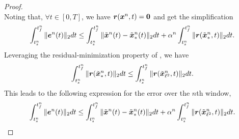 \begin{proof}
\begin{equation*}
\end{equation*}
Noting that, $\forall t \in [0,T]$, we have $\boldsymbol r({\boldsymbol x}^{n},t) = \boldsymbol 0$ and get the simplification 
\begin{equation*}
\int_{t_s^{n}}^{t_f^{n}} \| \boldsymbol e^{n}(t) \|_2 dt \le \int_{t_s^{n}}^{t_f^{n}} \| \tilde{\boldsymbol x}^{n}(t) - \tilde{\boldsymbol x}_{*}^{n}(t) \|_2 dt + \alpha^{n} \int_{t_s^{n}}^{t_f^{n}} \|  \boldsymbol r(\tilde{\boldsymbol x}_{*}^{n},t)  \|_2 dt.
\end{equation*}
Leveraging the residual-minimization property of \methodAcronym, we have 
$$ \int_{t_s^{n}}^{t_f^{n}} \| \boldsymbol r(\tilde{\boldsymbol x}_{*}^{n},t) \|_2dt \le \int_{t_s^{n}}^{t_f^{n}} \| \boldsymbol r(\tilde{\boldsymbol x}_{\ell^2}^{n},t) \|_2dt.$$
This leads to the following expression for the error over the $n$th window,
\begin{equation}\label{eq:boundtmp}
\int_{t_s^{n}}^{t_f^{n}} \| \boldsymbol e^{n}(t) \|_2 dt \le \int_{t_s^{n}}^{t_f^{n}} \| \tilde{\boldsymbol x}^{n}(t) - \tilde{\boldsymbol x}_{*}^{n}(t) \|_2 dt + \alpha^{n} \int_{t_s^{n}}^{t_f^{n}} \|  \boldsymbol r(\tilde{\boldsymbol x}_{\ell^2}^{n},t)  \|_2 dt.
\end{equation}
\begin{comment}
To obtain an expression for $\norm{\stateROMSolArg{n}{t} - \stateROMStarSolArgt{n}{t}}$ start by noting that
$\stateROMStarSolArg{n}$ and $\stateROMSolArg{n}$ are defined by the systems,
\begin{align*} 
&\frac{d}{dt} \genstateROMSolArg{n}   -
\basisspace^T  \velocity(\basisspace \genstateROMSolArg{n} + \stateIntercept,t) =  \adjointROMSolArg{n} , \\
 &\frac{d}{dt} \adjointROMSolArg{n} + \basisspace^T \bigg[\frac{\partial
\velocity}{\partial \stateyDiscrete}(\basisspace \genstateROMSolArg{n} +
\stateIntercept,t)\bigg]^T \basisspace \adjointROMSolArg{n} = \basisspace^T \bigg[
\frac{\partial \velocity}{\partial \stateyDiscrete} (\basisspace \genstateROMSolArg{n} +
\stateIntercept,t) \bigg]^T \bigg( \mathbf{I} -   \basisspace \basisspace^T
\bigg)    \velocity(\basisspace \genstateROMSolArg{n} + \stateIntercept,t) , \\  
& \genstateROMSolArgt{n}{\timeStartArg{n}} =

\end{comment}
\end{proof}
